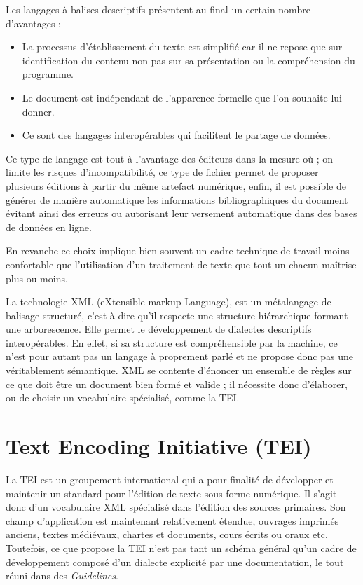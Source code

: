 \documentclass[12pt,a4paper,oneside]{book} %
\begin{document}
Les langages à balises descriptifs présentent au final un certain nombre d'avantages :

\begin{itemize}
\item La processus d'établissement du texte est simplifié car il ne repose que sur identification du contenu non pas sur sa présentation ou la compréhension du programme. 
\item Le document est indépendant de l'apparence formelle que l'on souhaite lui donner. 
\item Ce sont des langages interopérables qui facilitent le partage de données.
\end{itemize}
\bigskip 

Ce type de langage est tout à l'avantage des éditeurs dans la mesure où ; on limite les risques d'incompatibilité, ce type de fichier permet de proposer plusieurs éditions à partir du même artefact numérique, enfin, il est possible de générer de manière automatique les informations bibliographiques du document évitant ainsi des erreurs ou autorisant leur versement automatique dans des bases de données en ligne.
\bigskip 

En revanche ce choix implique bien souvent un cadre technique de travail moins confortable que l'utilisation d'un traitement de texte que tout un chacun maîtrise plus ou moins.
\bigskip 

La technologie XML (eXtensible markup Language), est un métalangage de balisage structuré, c'est à dire qu'il respecte une structure hiérarchique formant une arborescence. Elle permet le développement de dialectes descriptifs interopérables. En effet, si sa structure est compréhensible par la machine, ce n'est pour autant pas un langage à proprement parlé et ne propose donc pas une véritablement sémantique. XML se contente d'énoncer un ensemble de règles sur ce que doit être un document bien formé et valide ; il nécessite donc d'élaborer, ou de choisir un vocabulaire spécialisé, comme la TEI. 

\section{Text Encoding Initiative (TEI)}

La TEI est un groupement international qui a pour finalité de développer et maintenir un standard pour l'édition de texte sous forme numérique.
Il s'agit donc d'un vocabulaire XML spécialisé dans l'édition des sources primaires. Son champ d'application est maintenant relativement étendue, ouvrages imprimés anciens, textes médiévaux, chartes et documents, cours écrits ou oraux etc. Toutefois, ce que propose la TEI n'est pas tant un schéma général qu'un cadre de développement composé d'un dialecte explicité par une documentation, le tout réuni dans des \textit{Guidelines}.
\bigskip 
\end{document}
